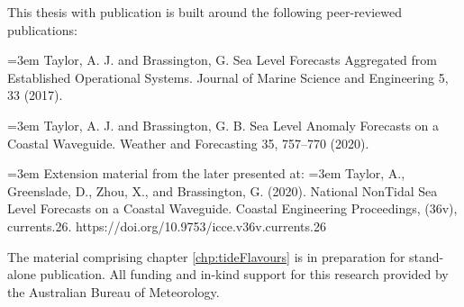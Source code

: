 
\begin{preface}

This thesis with publication is built around the following peer-reviewed publications:

\vspace{5mm}
\hangindent=3em
Taylor, A. J. and Brassington, G. Sea Level Forecasts Aggregated from Established Operational Systems. Journal of Marine Science and Engineering 5, 33 (2017).



\vspace{5mm}
\hangindent=3em
Taylor, A. J. and Brassington, G. B. Sea Level Anomaly Forecasts on a Coastal Waveguide. Weather and Forecasting 35, 757–770 (2020).

\vspace{5mm}
\hangindent=3em
Extension material from the later presented at:
\vspace{5mm}
\hangindent=3em
Taylor, A., Greenslade, D., Zhou, X., and Brassington, G. (2020). National NonTidal Sea Level Forecasts on a Coastal Waveguide. Coastal Engineering Proceedings, (36v), currents.26. https://doi.org/10.9753/icce.v36v.currents.26

\vspace{5mm}
The material comprising chapter \ref{chp:tideFlavours} is in preparation for stand-alone publication.
All funding and in-kind support for this research provided by the Australian Bureau of Meteorology. 

\end{preface}

